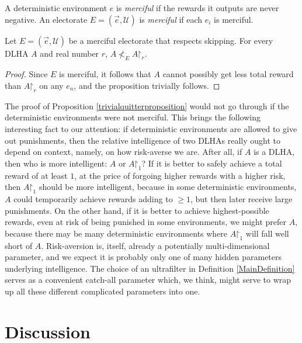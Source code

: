 \documentclass[twoside,11pt]{article}
\begin{document}
\begin{definition}
    A deterministic environment $e$ is \emph{merciful} if
    the rewards it outputs are never negative.
    An electorate $E=(\vec{e},\mathscr U)$ is \emph{merciful}
    if each $e_i$ is merciful.
\end{definition}

\begin{proposition}
\label{trivialquitterproposition}
    Let $E=(\vec{e},\mathscr U)$ be a merciful electorate that respects skipping.
    For every DLHA $A$ and real number $r$, $A\not<_{E}A\mathord{\restriction}_r$.
\end{proposition}

\begin{proof}
    Since $E$ is merciful,
    it follows that $A$ cannot possibly get less total reward than $A\mathord{\restriction}_r$
    on any $e_n$, and the proposition trivially follows.
\end{proof}

The proof of Proposition \ref{trivialquitterproposition} would not go through if
the deterministic environments were not merciful.
This brings the following interesting fact to our attention:
if deterministic environments are allowed to give out punishments,
then the relative intelligence of two DLHAs really ought to depend on
context, namely, on how risk-averse we are.
After all, if $A$ is a DLHA, then who
is more intelligent: $A$ or $A\mathord{\restriction}_1$?
If it is better to safely achieve a total reward of at
least $1$, at the price of forgoing higher rewards with a higher risk,
then $A\mathord{\restriction}_1$
should be more intelligent, because in some deterministic environments,
$A$ could temporarily achieve rewards adding to $\geq 1$, but then later
receive large punishments. On the other hand, if
it is better to achieve highest-possible rewards, even at risk of being punished
in some environments, we might prefer $A$, because there may be many deterministic environments
where $A\mathord{\restriction}_1$ will fall well short of $A$.
Risk-aversion is, itself, already a potentially multi-dimensional parameter, and we
expect it is probably only one of many hidden parameters
underlying intelligence. The choice of an ultrafilter in Definition \ref{MainDefinition}
serves as a convenient catch-all parameter which, we think, might serve to wrap up all
these different complicated parameters into one.


\section{Discussion}
\label{objectionsection}
\end{document}
